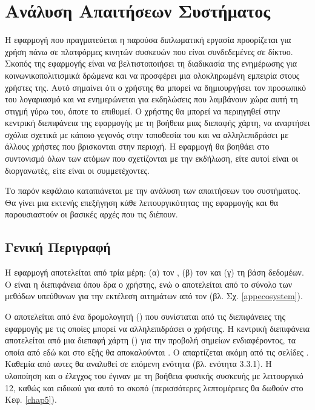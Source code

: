 \chapter{Ανάλυση Απαιτήσεων Συστήματος}
\label{chap3}

Η εφαρμογή που πραγματεύεται η παρούσα διπλωματική εργασία προορίζεται για χρήση πάνω σε πλατφόρμες κινητών συσκευών που είναι συνδεδεμένες σε δίκτυο. Σκοπός της εφαρμογής είναι να βελτιστοποιήσει τη διαδικασία της ενημέρωσης για κοινωνικοπολιτισμικά δρώμενα και να προσφέρει μια ολοκληρωμένη εμπειρία στους χρήστες της. Αυτό σημαίνει ότι ο χρήστης θα μπορεί να δημιουργήσει τον προσωπικό του λογαριασμό και να ενημερώνεται για εκδηλώσεις που λαμβάνουν χώρα αυτή τη στιγμή γύρω του, όποτε το επιθυμεί. Ο χρήστης θα μπορεί να περιηγηθεί στην κεντρική διεπιφάνεια της εφαρμογής με τη βοήθεια μιας διεπαφής χάρτη, να αναρτήσει σχόλια σχετικά με κάποιο γεγονός στην τοποθεσία του και να αλληλεπιδράσει με άλλους χρήστες που βρισκονται στην περιοχή. Η εφαρμογή θα βοηθάει στο συντονισμό όλων των ατόμων που σχετίζονται με την εκδήλωση, είτε αυτοί είναι οι διοργανωτές, είτε είναι οι συμμετέχοντες.

Το παρόν κεφάλαιο καταπιάνεται με την ανάλυση των απαιτήσεων του συστήματος. Θα γίνει μια εκτενής επεξήγηση κάθε λειτουργικότητας της εφαρμογής και θα παρουσιαστούν οι βασικές αρχές που τις διέπουν.

\section{Γενική Περιγραφή}
Η εφαρμογή αποτελείται από τρία μέρη: (α) τον , (β) τον  και (γ) τη βάση δεδομέων. Ο  είναι η διεπιφάνεια όπου δρα ο χρήστης, ενώ ο  αποτελείται από το σύνολο των μεθόδων υπεύθυνων για την εκτέλεση αιτημάτων από τον  (βλ. Σχ. \ref{appecosystem}).

Ο  αποτελείται από ένα δρομολογητή () που συνίσταται από τις διεπιφάνειες της εφαρμογής με τις οποίες μπορεί να αλληλεπιδράσει ο χρήστης. Η κεντρική διεπιφάνεια αποτελείται από μια διεπαφή χάρτη () για την προβολή σημείων ενδιαφέροντος, τα οποία από εδώ και στο εξής θα αποκαλούνται . Ο  απαρτίζεται ακόμη από τις σελίδες . Καθεμία από αυτες θα αναλυθεί σε επόμενη ενότητα (βλ. ενότητα 3.3.1). Η υλοποίηση και ο έλεγχος του  έγιναν με τη βοήθεια φυσικής συσκευής με λειτουργικό  12, καθώς και ειδικού  για αυτό το σκοπό (περισσότερες λεπτομέρειες θα δωθούν στο Κεφ. \ref{chap5}).

